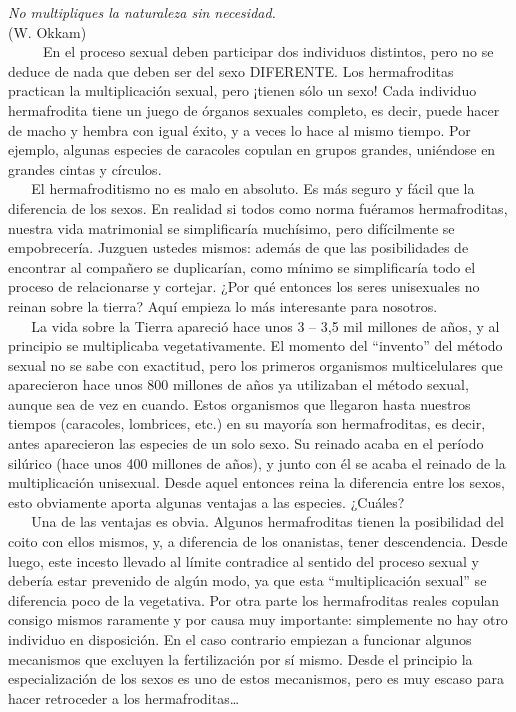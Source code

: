 \noindent
\textit{No multipliques la naturaleza sin necesidad.}\\
(W. Okkam)\\

~ ~ ~ En el proceso sexual deben participar dos individuos distintos,
pero no se deduce de nada que deben ser del sexo DIFERENTE. Los
hermafroditas practican la multiplicación sexual, pero ¡tienen sólo un
sexo! Cada individuo hermafrodita tiene un juego de órganos sexuales
completo, es decir, puede hacer de macho y hembra con igual éxito, y a
veces lo hace al mismo tiempo. Por ejemplo, algunas especies de
caracoles copulan en grupos grandes, uniéndose en grandes cintas y
círculos.\\
\hspace*{0.333em} ~ ~ El hermafroditismo no es malo en absoluto. Es más
seguro y fácil que la diferencia de los sexos. En realidad si todos como
norma fuéramos hermafroditas, nuestra vida matrimonial se simplificaría
muchísimo, pero difícilmente se empobrecería. Juzguen ustedes mismos:
además de que las posibilidades de encontrar al compañero se
duplicarían, como mínimo se simplificaría todo el proceso de
relacionarse y cortejar. ¿Por qué entonces los seres unisexuales no
reinan sobre la tierra? Aquí empieza lo más interesante para nosotros.\\
\hspace*{0.333em} ~ ~ La vida sobre la Tierra apareció hace unos 3 --
3,5 mil millones de años, y al principio se multiplicaba
vegetativamente. El momento del ``invento'' del método sexual no se sabe
con exactitud, pero los primeros organismos multicelulares que
aparecieron hace unos 800 millones de años ya utilizaban el método
sexual, aunque sea de vez en cuando. Estos organismos que llegaron hasta
nuestros tiempos (caracoles, lombrices, etc.) en su mayoría son
hermafroditas, es decir, antes aparecieron las especies de un solo sexo.
Su reinado acaba en el período silúrico (hace unos 400 millones de
años), y junto con él se acaba el reinado de la multiplicación
unisexual. Desde aquel entonces reina la diferencia entre los sexos,
esto obviamente aporta algunas ventajas a las especies. ¿Cuáles?\\
\hspace*{0.333em} ~ ~ Una de las ventajas es obvia. Algunos
hermafroditas tienen la posibilidad del coito con ellos mismos, y, a
diferencia de los onanistas, tener descendencia. Desde luego, este
incesto llevado al límite contradice al sentido del proceso sexual y
debería estar prevenido de algún modo, ya que esta ``multiplicación
sexual'' se diferencia poco de la vegetativa. Por otra parte los
hermafroditas reales copulan consigo mismos raramente y por causa muy
importante: simplemente no hay otro individuo en disposición. En el caso
contrario empiezan a funcionar algunos mecanismos que excluyen la
fertilización por sí mismo. Desde el principio la especialización de los
sexos es uno de estos mecanismos, pero es muy escaso para hacer
retroceder a los hermafroditas\ldots{}

